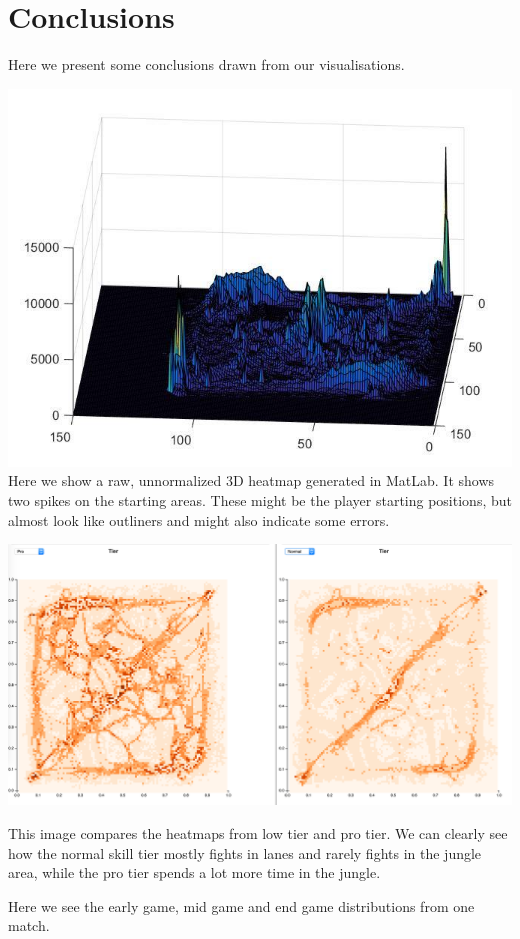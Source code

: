 \section{Conclusions}

Here we present some conclusions drawn from our visualisations.

\includegraphics[width=\textwidth]{HM3D}
Here we show a raw, unnormalized 3D heatmap generated in MatLab. It shows two spikes on the starting areas. These might be the player starting positions, but almost look like outliners and might also indicate some errors.

\includegraphics[width=\textwidth]{HM_tiers}

This image compares the heatmaps from low tier and pro tier. We can clearly see how the normal skill tier mostly fights in lanes and rarely fights in the jungle area, while the pro tier spends a lot more time in the jungle.

Here we see the early game, mid game and end game distributions from one match.

